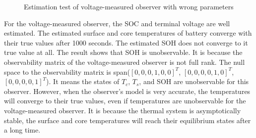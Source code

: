 \documentclass[12pt]{article}
\begin{document}
\begin{figure}[H]
\begin{subfigure}[t]{0.3\linewidth}
	\end{subfigure}	
	\caption{Estimation test of voltage-measured observer with wrong parameters }\label{fig:estVoltPar}
\end{figure}
For the voltage-measured observer, the SOC and terminal voltage are well estimated. The estimated surface and core temperatures of battery converge with their true values after 1000 seconds. The estimated SOH does not converge to it true value at all. The result shows that SOH is unobservable. It is because the observability matrix of the voltage-measured observer is not full rank. The null space to the observability matrix is span($[0,0,0,1,0,0]^T$, $[0,0,0,0,1,0]^T$, $[0,0,0,0,1]^T$). It means the states of $T_c$, $T_s$, and SOH are unobservable for this observer. However, when the observer's model is very accurate, the temperatures will converge to their true values, even if temperatures are unobservable for the voltage-measured observer. It is because the thermal system is asymptotically stable, the surface and core temperatures will reach their equilibrium states after a long time. 
\end{document}
